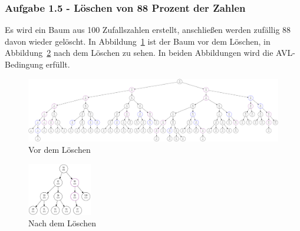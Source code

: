 \subsubsection{Aufgabe 1.5 - Löschen von 88 Prozent der Zahlen}
Es wird ein Baum aus 100 Zufallszahlen erstellt, anschließen werden zufällig 88 davon wieder
gelöscht.
In Abbildung~\ref{fig:88before} ist der Baum vor dem Löschen,
in Abbildung~\ref{fig:88after} nach dem Löschen zu sehen.
In beiden Abbildungen wird die AVL-Bedingung erfüllt.

\begin{figure}[hbtp]
    \centerline{\includegraphics[width = 1.2\textwidth]{img/gv/aufgabe1_6_before.pdf}}
    \caption{Vor dem Löschen}
    \label{fig:88before}
\end{figure}

\begin{figure}[hbtp]
    \centering
    \includegraphics[width = 0.25\textwidth]{img/gv/aufgabe1_6_after.pdf}
    \caption{Nach dem Löschen}
    \label{fig:88after}
\end{figure}

